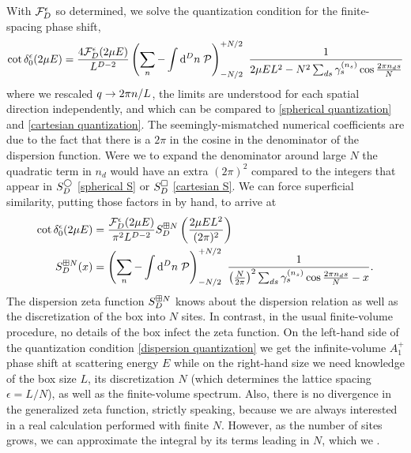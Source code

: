 With $\mathcal{F}_D^\epsilon$ so determined, we solve the quantization condition for the finite-spacing phase shift,
\begin{align}
    \cot \delta_0^\epsilon(2\mu E)
    =
    \frac{4\mathcal{F}_D^\epsilon(2\mu E)}{L^{D-2}}
    \left(\sum_n - \int \mathrm{d}^D n\; \mathcal{P} \right)_{-N/2}^{+N/2}\  \frac{1}{2\mu E L^2 - N^2 \sum_{ds} \gamma^{({n_s})}_s \cos \frac{2\pi n_d s}{N}}
\end{align}
where we rescaled $q\rightarrow 2\pi n/L$, the limits are understood for each spatial direction independently, and which can be compared to \eqref{spherical quantization} and \eqref{cartesian quantization}.  The seemingly-mismatched numerical coefficients are due to the fact that there is a $2\pi$ in the cosine in the denominator of the dispersion function.
Were we to expand the denominator around large $N$ the quadratic term in $n_d$ would have an extra $(2\pi)^2$ compared to the integers that appear in $S^\bigcirc_D$ \eqref{spherical S} or $S^\square_D$ \eqref{cartesian S}.  We can force superficial similarity, putting those factors in by hand, to arrive at
\begin{align}
    \label{eq:dispersion quantization}
    \cot \delta_0^{\epsilon}( 2\mu E ) &= \frac{\mathcal{F}_D^\epsilon(2\mu E)}{\pi^2 L^{D-2}} S^{\boxplus N}_{D}\left(\frac{2\mu E L^2}{(2\pi)^2}\right)
    \\
    \label{eq:dispersion S}
    S^{\boxplus N}_{D}( x )
    &=
    \left(\sum_n - \int \mathrm{d}^D n\; \mathcal{P} \right)_{-N/2}^{+N/2}\  \frac{1}{\left(\frac{N}{2\pi}\right)^2 \sum_{ds} \gamma^{({n_s})}_s \cos \frac{2\pi n_d s}{N} - x}.
\end{align}
The dispersion zeta function $S^{\boxplus N}_{D}$ knows about the dispersion relation as well as the discretization of the box into $N$ sites.
In contrast, in the usual finite-volume procedure, no details of the box infect the zeta function.
On the left-hand side of the quantization condition \eqref{dispersion quantization} we get the infinite-volume $A_1^+$ phase shift at scattering energy $E$ while on the right-hand size we need knowledge of the box size $L$, its discretization $N$ (which determines the lattice spacing $\epsilon=L/N$), as well as the finite-volume spectrum.
Also, there is no divergence in the generalized zeta function, strictly speaking, because we are always interested in a real calculation performed with finite $N$.
However, as the number of sites grows, we can approximate the integral by its terms leading in $N$, which we .


